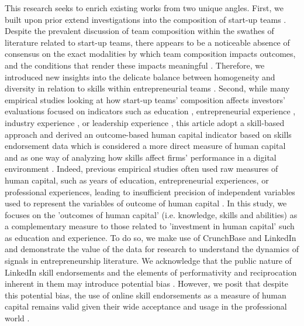 \documentclass[12pt]{article}
\begin{document}
This research seeks to enrich existing works from two unique angles. First, we built upon prior extend investigations into the composition of start-up teams \citep{beckman2007early, jung2017entrepreneurial}. Despite the prevalent discussion of team composition within the swathes of literature related to start-up teams, there appears to be a noticeable absence of consensus on the exact modalities by which team composition impacts outcomes, and the conditions that render these impacts meaningful \citep{klotz2014new, zhou2015entrepreneurial}. Therefore, we introduced new insights into the delicate balance between homogeneity and diversity in relation to skills within entrepreneurial teams \citep{sundermeier2022entrepreneurial, villani2018entrepreneurial}. Second, while many empirical studies looking at how start-up teams' composition affects investors' evaluations focused on indicators such as education \citep{franke2008venture}, entrepreneurial experience \citep{beckman2007early}, industry experience \citep{becker2015new}, or leadership experience \citep{hoenig2015quality}, this article adopt a skill-based approach and derived an outcome-based human capital indicator based on skills endorsement data which is considered a more direct measure of human capital and as one way of analyzing how skills affect firms' performance in a digital environment \citep{colombo2021use, drover2017review, klein2020start, marvel2016human}. Indeed, previous empirical studies often used raw measures of human capital, such as years of education, entrepreneurial experiences, or professional experiences, leading to insufficient precision of independent variables used to represent the variables of outcome of human capital \citep{harrison2007s}. In this study, we focuses on the 'outcomes of human capital' (i.e. knowledge, skills and abilities) as a complementary measure to those related to 'investment in human capital' such as education and experience. To do so, we make use of CrunchBase and LinkedIn and demonstrate the value of the data for research to understand the dynamics of signals in entrepreneurship literature. We acknowledge that the public nature of LinkedIn skill endorsements and the elements of performativity and reciprocation inherent in them may introduce potential bias \citep{perez2016endorsement}. However, we posit that despite this potential bias, the use of online skill endorsements as a measure of human capital remains valid given their wide acceptance and usage in the professional world \citep{perez2016endorsement, gasiorowski2022pay}.
\end{document}
